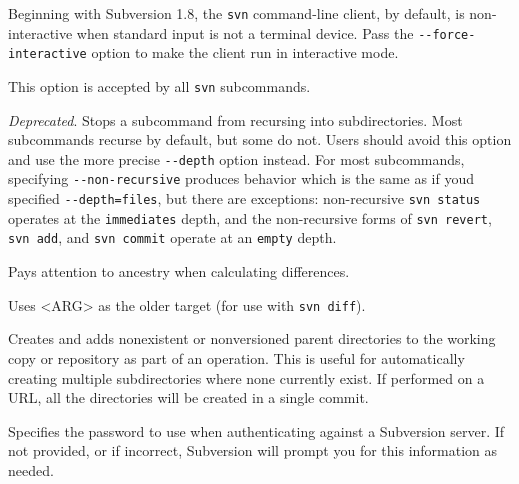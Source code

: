 \begin{description}
Beginning with Subversion 1.8, the \texttt{svn} command-line client, by
default, is non-interactive when standard input is not a terminal
device. Pass the \texttt{-\/-force-interactive} option to make the
client run in interactive mode.

This option is accepted by all \texttt{svn} subcommands.
\item[\protect\phantomsection\label{svn.ref.svn.sw.non_recursive}{}\texttt{-\/-non-recursive}
(\texttt{-N})]
\emph{Deprecated}. Stops a subcommand from recursing into
subdirectories. Most subcommands recurse by default, but some do not.
Users should avoid this option and use the more precise
\texttt{-\/-depth} option instead. For most subcommands, specifying
\texttt{-\/-non-recursive} produces behavior which is the same as if
you\textquotesingle d specified \texttt{-\/-depth=files}, but there are
exceptions: non-recursive \texttt{svn\ status} operates at the
\texttt{immediates} depth, and the non-recursive forms of
\texttt{svn\ revert}, \texttt{svn\ add}, and \texttt{svn\ commit}
operate at an \texttt{empty} depth.
\item[\protect\phantomsection\label{svn.ref.svn.sw.notice_ancestry}{}\texttt{-\/-notice-ancestry}]
Pays attention to ancestry when calculating differences.
\item[\protect\phantomsection\label{svn.ref.svn.sw.old}{}\texttt{-\/-old}
\textless ARG\textgreater{}]
Uses \textless ARG\textgreater{} as the older target (for use with
\texttt{svn\ diff}).
\item[\protect\phantomsection\label{svn.ref.svn.sw.parents}{}\texttt{-\/-parents}]
Creates and adds nonexistent or nonversioned parent directories to the
working copy or repository as part of an operation. This is useful for
automatically creating multiple subdirectories where none currently
exist. If performed on a URL, all the directories will be created in a
single commit.
\item[\protect\phantomsection\label{svn.ref.svn.sw.password}{}\texttt{-\/-password}
\textless PASSWD\textgreater{}]
Specifies the password to use when authenticating against a Subversion
server. If not provided, or if incorrect, Subversion will prompt you for
this information as needed.


\end{description}
